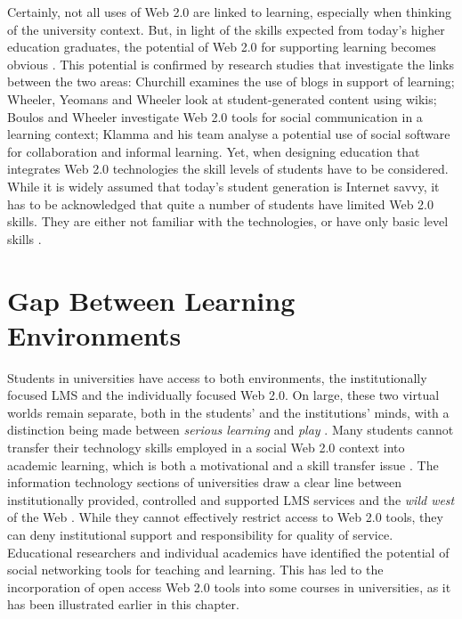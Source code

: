 Certainly, not all uses of Web 2.0 are linked to learning, especially when
thinking of the university context. But, in light of the \LLLs skills expected
from today's higher education graduates, the potential of Web 2.0 for supporting
learning becomes obvious \citep{Tian2011}. This potential is confirmed by
research studies that investigate the links between the two areas: Churchill
\citeyearpar{Churchill2009} examines the use of blogs in support of learning;
Wheeler, Yeomans and Wheeler \citeyearpar{Wheeler2008} look at student-generated
content using wikis; Boulos and Wheeler \citeyearpar{Boulos2007} investigate Web
2.0 tools for social communication in a learning context; Klamma and his team
\citeyearpar{Klamma2007} analyse a potential use of social software for
collaboration and informal learning. Yet, when designing education that
integrates Web 2.0 technologies the skill levels of students have to be
considered. While it is widely assumed that today's student generation is
Internet savvy, it has to be acknowledged that quite a number of students have
limited Web 2.0 skills. They are either not familiar with the technologies, or
have only basic level skills \citep{Kennedy2008}.

\section{Gap Between Learning Environments}
Students in universities have access to both environments, the institutionally
focused LMS and the individually focused Web 2.0. On large, these two virtual
worlds remain separate, both in the students' and the institutions' minds, with
a distinction being made between \textit{serious learning} and \textit{play}
\citep{Freire2008}. Many students cannot transfer their technology skills
employed in a social Web 2.0 context into academic learning, which is both a
motivational and a skill transfer issue \citep{Katz2005}. The information
technology sections of universities draw a clear line between institutionally
provided, controlled and supported LMS services and the \textit{wild west} of
the Web \citep{Havenstein2007a}. While they cannot effectively restrict access
to Web 2.0 tools, they can deny institutional support and responsibility for
quality of service. Educational researchers and individual academics have
identified the potential of social networking tools for teaching and learning.
This has led to the incorporation of open access Web 2.0 tools into some courses
in universities, as it has been illustrated earlier in this chapter.

